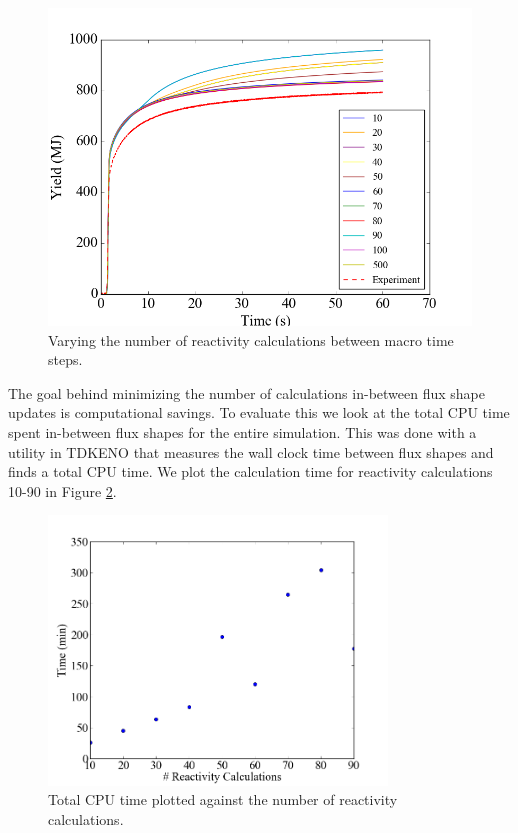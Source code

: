 \documentclass{anstrans}
\begin{document}
\begin{figure}[h]
    \centering
    \includegraphics[width = 9 cm]{figures/ptkinvar.png}
    \caption{Varying the number of reactivity calculations between macro time steps.}
    \label{fig:ptkinvar}
\end{figure}

The goal behind minimizing the number of calculations in-between flux shape updates is computational savings.  To evaluate this we look at the total CPU time spent in-between flux shapes for the entire simulation.  This was done with a utility in TDKENO that measures the wall clock time between flux shapes and finds a total CPU time. We plot the calculation time for reactivity calculations 10-90 in Figure \ref{fig:ptkin_time}.  

\begin{figure}[h]
    \centering
    \includegraphics[width=9cm]{figures/ptkin_time_var.png}
    \caption{Total CPU time plotted against the number of reactivity calculations. }
    \label{fig:ptkin_time}
\end{figure}
\end{document}
